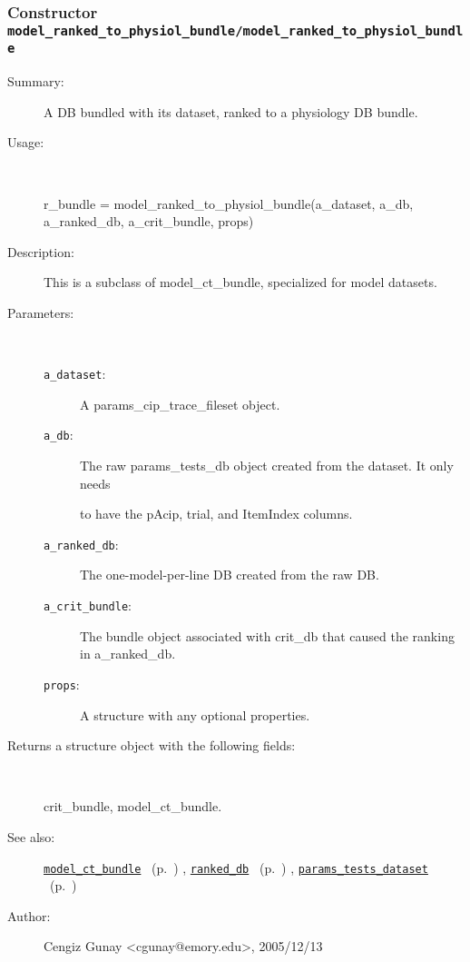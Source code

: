 \subsubsection[Constructor \texttt{model\_ranked\_to\_physiol\_bundle}]{Constructor \texttt{model\_ranked\_to\_physiol\_bundle/model\_ranked\_to\_physiol\_bundle}}%
%
\label{ref_model_ranked_to_physiol_bundle__model_ranked_to_physiol_bundle}%
\hypertarget{ref_model_ranked_to_physiol_bundle__model_ranked_to_physiol_bundle}{}%
\begin{description}
\item[Summary:]A DB bundled with its dataset, ranked to a physiology DB bundle.
%
\item[Usage:]~%
\begin{lyxcode}%
r\_bundle = model\_ranked\_to\_physiol\_bundle(a\_dataset, a\_db, a\_ranked\_db, a\_crit\_bundle, props)
%
\end{lyxcode}%
%
\item[Description:]%
This is a subclass of model\_ct\_bundle, specialized for model datasets. 
\item[Parameters:]~
\begin{description}%
\item[\texttt{a\_dataset}:]
 A params\_cip\_trace\_fileset object.
\item[\texttt{a\_db}:]
 The raw params\_tests\_db object created from the dataset. It only needs

to have the pAcip, trial, and ItemIndex columns.\item[\texttt{a\_ranked\_db}:]
 The one-model-per-line DB created from the raw DB.
\item[\texttt{a\_crit\_bundle}:]
 The bundle object associated with crit\_db that caused the ranking in a\_ranked\_db.
\item[\texttt{props}:]
 A structure with any optional properties.
\end{description}%
%
\item[Returns a structure object with the following fields:]~

	crit\_bundle, model\_ct\_bundle.
%
%
\item[See also:]%
\hyperlink{ref_model_ct_bundle}{\texttt{model\_ct\_bundle}}%
\ (p.~\pageref{ref_model_ct_bundle})%
%
, \hyperlink{ref_ranked_db}{\texttt{ranked\_db}}%
\ (p.~\pageref{ref_ranked_db})%
%
, \hyperlink{ref_params_tests_dataset}{\texttt{params\_tests\_dataset}}%
\ (p.~\pageref{ref_params_tests_dataset})%
%
%
\item[Author:]%
Cengiz Gunay <cgunay@emory.edu>, 2005/12/13%
\end{description}
\methodline%
